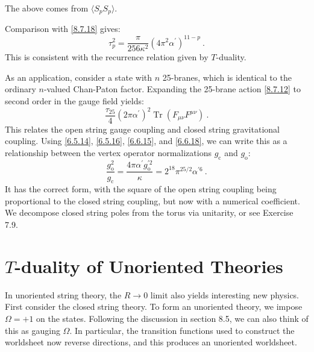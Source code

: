 \begin{tcolorbox}
	\begin{remark}
		The above comes from $\langle S_p S_p \rangle$.
	\end{remark}	
\end{tcolorbox}
\noindent Comparison with \eqref{8.7.18} gives:
\begin{equation}
	\tau_{p}^{2} = \frac{\pi}{256 \kappa^{2}} (4 \pi^{2} \alpha^{\prime})^{11-p} \:. \label{8.7.26}
\end{equation}
This is consistent with the recurrence relation given by $T$-duality.

As an application, consider a state with $n$ 25-branes, which is identical to the ordinary $n$-valued Chan-Paton factor. 
Expanding the 25-brane action \eqref{8.7.12} to second order in the gauge field yields:
\begin{equation}
	\frac{\tau_{25}}{4}(2 \pi \alpha^{\prime})^{2} \operatorname{Tr}(F_{\mu \nu} F^{\mu \nu}) \:. \label{8.7.27}
\end{equation}
This relates the open string gauge coupling and closed string gravitational coupling. 
Using \eqref{6.5.14}, \eqref{6.5.16}, \eqref{6.6.15}, and \eqref{6.6.18}, 
we can write this as a relationship between the vertex operator normalizations $g_{\mathrm{c}}$ and $g_{\mathrm{o}}$:
\begin{equation}
	\frac{g_{\mathrm{o}}^{2}}{g_{\mathrm{c}}} = \frac{4 \pi \alpha^{\prime} g_{\mathrm{o}}^{\prime 2}}{\kappa}
	= 2^{18} \pi^{25 / 2} \alpha^{\prime 6} \:. \label{8.7.28}
\end{equation}
It has the correct form, with the square of the open string coupling being proportional to the closed string coupling, but now with a numerical coefficient. We decompose closed string poles from the torus via unitarity, or see Exercise 7.9.

\section{\texorpdfstring{$T$-duality of Unoriented Theories}{8.8 $T$-duality of Unoriented Theories}} \label{sec:8.8}
In unoriented string theory, the $R \rightarrow 0$ limit also yields interesting new physics. First consider the closed string theory. To form an unoriented theory, we impose $\Omega=+1$ on the states. 
Following the discussion in section 8.5, we can also think of this as gauging $\Omega$. In particular, the transition functions used to construct the worldsheet now reverse directions, and this produces an unoriented worldsheet.

